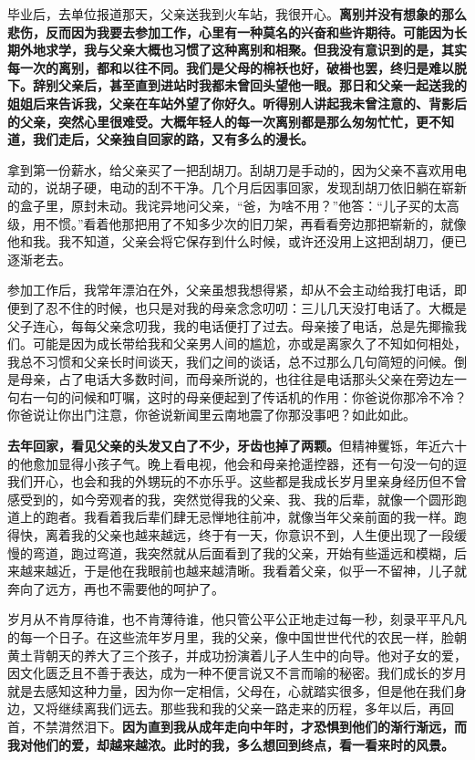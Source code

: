 \documentclass[UTF8,a4paper,8pt]{ctexart}
\begin{document}
 毕业后，去单位报道那天，父亲送我到火车站，我很开心。\textbf{离别并没有想象的那么悲伤，反而因为我要去参加工作，心里有一种莫名的兴奋和些许期待。可能因为长期外地求学，我与父亲大概也习惯了这种离别和相聚。但我没有意识到的是，其实每一次的离别，都和以往不同。我们是父母的棉袄也好，破褂也罢，终归是难以脱下。辞别父亲后，甚至直到进站时我都未曾回头望他一眼。那日和父亲一起送我的姐姐后来告诉我，父亲在车站外望了你好久。听得别人讲起我未曾注意的、背影后的父亲，突然心里很难受。大概年轻人的每一次离别都是那么匆匆忙忙，更不知道，我们走后，父亲独自回家的路，又有多么的漫长。}
 
 拿到第一份薪水，给父亲买了一把刮胡刀。刮胡刀是手动的，因为父亲不喜欢用电动的，说胡子硬，电动的刮不干净。几个月后因事回家，发现刮胡刀依旧躺在崭新的盒子里，原封未动。我诧异地问父亲，“爸，为啥不用？”他答：“儿子买的太高级，用不惯。”看着他那把用了不知多少次的旧刀架，再看看旁边那把崭新的，就像他和我。我不知道，父亲会将它保存到什么时候，或许还没用上这把刮胡刀，便已逐渐老去。
 
 参加工作后，我常年漂泊在外，父亲虽想我想得紧，却从不会主动给我打电话，即便到了忍不住的时候，也只是对我的母亲念念叨叨：三儿几天没打电话了。大概是父子连心，每每父亲念叨我，我的电话便打了过去。母亲接了电话，总是先揶揄我们。可能是因为成长带给我和父亲男人间的尴尬，亦或是离家久了不知如何相处，我总不习惯和父亲长时间谈天，我们之间的谈话，总不过那么几句简短的问候。倒是母亲，占了电话大多数时间，而母亲所说的，也往往是电话那头父亲在旁边左一句右一句的问候和叮嘱，这时的母亲便起到了传话机的作用：你爸说你那冷不冷？你爸说让你出门注意，你爸说新闻里云南地震了你那没事吧？如此如此。
 
 \textbf{去年回家，看见父亲的头发又白了不少，牙齿也掉了两颗。}但精神矍铄，年近六十的他愈加显得小孩子气。晚上看电视，他会和母亲抢遥控器，还有一句没一句的逗我们开心，也会和我的外甥玩的不亦乐乎。这些都是我成长岁月里亲身经历但不曾感受到的，如今旁观者的我，突然觉得我的父亲、我、我的后辈，就像一个圆形跑道上的跑者。我看着我后辈们肆无忌惮地往前冲，就像当年父亲前面的我一样。跑得快，离着我的父亲也越来越远，终于有一天，你意识不到，人生便出现了一段缓慢的弯道，跑过弯道，我突然就从后面看到了我的父亲，开始有些遥远和模糊，后来越来越近，于是他在我眼前也越来越清晰。我看着父亲，似乎一不留神，儿子就奔向了远方，再也不需要他的呵护了。
 
 岁月从不肯厚待谁，也不肯薄待谁，他只管公平公正地走过每一秒，刻录平平凡凡的每一个日子。在这些流年岁月里，我的父亲，像中国世世代代的农民一样，脸朝黄土背朝天的养大了三个孩子，并成功扮演着儿子人生中的向导。他对子女的爱，因文化匮乏且不善于表达，成为一种不便言说又不言而喻的秘密。我们成长的岁月就是去感知这种力量，因为你一定相信，父母在，心就踏实很多，但是他在我们身边，又将继续离我们远去。那些我和我的父亲一路走来的历程，多年以后，再回首，不禁潸然泪下。\textbf{因为直到我从成年走向中年时，才恐惧到他们的渐行渐远，而我对他们的爱，却越来越浓。此时的我，多么想回到终点，看一看来时的风景。}
 
\end{document}
